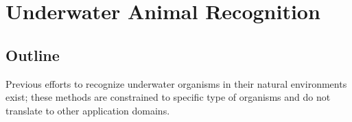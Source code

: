 \documentclass {udthesis}
\begin{document}

\chapter{Underwater Animal Recognition}


\section{Outline}

Previous efforts to recognize underwater organisms in their natural environments exist; these methods are constrained to specific type of organisms and do not translate to other application domains.
\end{document}
